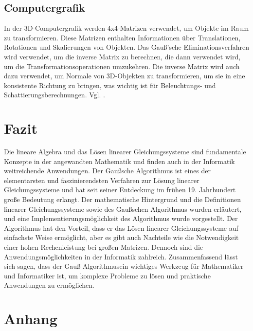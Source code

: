 \documentclass[a4paper, 12pt]{report}
\newcommand{\GA}{Gauß-Algorithmus}
\begin{document}
\section{Computergrafik}
In der 3D-Computergrafik werden 4x4-Matrizen verwendet, um Objekte im Raum zu transformieren.
Diese Matrizen enthalten Informationen über Translationen, Rotationen und Skalierungen von Objekten.
Das Gauß'sche Eliminationsverfahren wird verwendet, um die inverse Matrix zu berechnen, die dann verwendet wird,
um die Transformationsoperationen umzukehren. Die inverse Matrix wird auch dazu verwendet, um Normale von 3D-Objekten zu transformieren,
um sie in eine konsistente Richtung zu bringen, was wichtig ist für Beleuchtungs- und Schattierungsberechnungen. Vgl. \cite{6}.

{\let\clearpage\relax \chapter{Fazit}}
Die lineare Algebra und das Lösen linearer Gleichungssysteme sind fundamentale Konzepte in der angewandten Mathematik
und finden auch in der Informatik weitreichende Anwendungen. Der Gaußsche Algorithmus ist eines der elementarsten und faszinierendsten Verfahren
zur Lösung linearer Gleichungssysteme und hat seit seiner Entdeckung im frühen 19. Jahrhundert große Bedeutung erlangt.
Der mathematische Hintergrund und die Definitionen linearer Gleichungssysteme sowie des Gaußschen Algorithmus wurden
erläutert, und eine Implementierungsmöglichkeit des Algorithmus wurde vorgestellt.
Der Algorithmus hat den Vorteil, dass er das Lösen linearer Gleichungssysteme auf einfachste Weise ermöglicht,
aber es gibt auch Nachteile wie die Notwendigkeit einer hohen Rechenleistung bei großen Matrizen.
Dennoch sind die Anwendungsmöglichkeiten in der Informatik zahlreich.
Zusammenfassend lässt sich sagen, dass der \GA ein wichtiges Werkzeug für
Mathematiker und Informatiker ist, um komplexe Probleme zu lösen und praktische Anwendungen zu ermöglichen.


{\let\clearpage\relax\chapter*{Anhang}}
\footnotesize

\printbibliography
\end{document}
